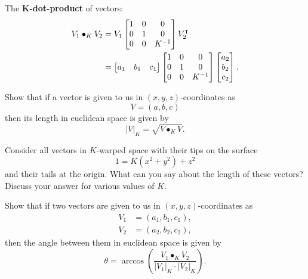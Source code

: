 \documentclass{ximera}
\begin{document}
\begin{definition}
The \textbf{$\boldsymbol{K}$-dot-product} of vectors:%
\begin{align*}
V_{1}\bullet_{K}V_{2}  &=V_{1} 
\begin{bmatrix}
1 & 0 & 0\\
0 & 1 & 0\\
0 & 0 & K^{-1}%
\end{bmatrix}
V_{2}^\transpose\\
&=
\begin{bmatrix}
a_{1} & b_{1} & c_{1}%
\end{bmatrix}
\begin{bmatrix}
1 & 0 & 0\\
0 & 1 & 0\\
0 & 0 & K^{-1}%
\end{bmatrix}
\begin{bmatrix}
a_{2}\\
b_{2}\\
c_{2}%
\end{bmatrix}.
\end{align*}

\end{definition}

\begin{problem}
  Show that if a vector is given to us in $(x,y,z)$-coordinates as%
\[
V =\left(a,b,c\right)
\]
then its length in euclidean space is given by
\[
|V|_K=\sqrt{V\bullet_K V}.
\]
\end{problem}

\begin{problem}
  Consider all vectors in $K$-warped space with their tips on the
  surface
  \[
  1=K(x^2+y^2)+z^2
  \]
  and their tails at the origin. What can you say about the length of
  these vectors? Discuss your answer for various values of $K$.
\end{problem}


\begin{problem}
  Show that if two vectors are given to us in $(x,y,z)$-coordinates as%
\begin{align*}
V_{1}  &=\left(  a_{1},b_{1},c_{1}\right), \\
V_{2}  &=\left(  a_{2},b_{2},c_{2}\right),
\end{align*}
then the angle between them in euclidean space is given by
\[
\theta = \arccos\left(\frac{V_1\bullet_K V_2}{\left| V_1\right|_K \cdot\left|V_2\right|_K }\right).
\]
\end{problem}
\end{document}
